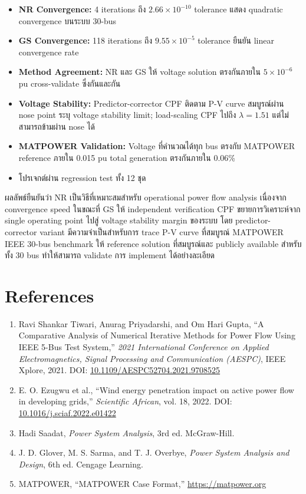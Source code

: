 \documentclass[12pt,a4paper]{article}
\begin{document}
\begin{itemize}
    \item \textbf{NR Convergence:} 4 iterations ถึง $2.66\times10^{-10}$ tolerance แสดง quadratic convergence บนระบบ 30-bus
    \item \textbf{GS Convergence:} 118 iterations ถึง $9.55\times10^{-5}$ tolerance ยืนยัน linear convergence rate
    \item \textbf{Method Agreement:} NR และ GS ให้ voltage solution ตรงกันภายใน $5\times10^{-6}$ pu cross-validate ซึ่งกันและกัน
    \item \textbf{Voltage Stability:} Predictor-corrector CPF ติดตาม P-V curve สมบูรณ์ผ่าน nose point ระบุ voltage stability limit; load-scaling CPF ไปถึง $\lambda = 1.51$ แต่ไม่สามารถข้ามผ่าน nose ได้
    \item \textbf{MATPOWER Validation:} Voltage ที่คำนวณได้ทุก bus ตรงกับ MATPOWER reference ภายใน 0.015 pu total generation ตรงกันภายใน 0.06\%
    \item โปรเจกต์ผ่าน regression test ทั้ง 12 ชุด
\end{itemize}

ผลลัพธ์ยืนยันว่า NR เป็นวิธีที่เหมาะสมสำหรับ operational power flow analysis เนื่องจาก convergence speed ในขณะที่ GS ให้ independent verification CPF ขยายการวิเคราะห์จาก single operating point ไปสู่ voltage stability margin ของระบบ โดย predictor-corrector variant มีความจำเป็นสำหรับการ trace P-V curve ที่สมบูรณ์ MATPOWER IEEE 30-bus benchmark ให้ reference solution ที่สมบูรณ์และ publicly available สำหรับทั้ง 30 bus ทำให้สามารถ validate การ implement ได้อย่างละเอียด

\section{References}

\begin{enumerate}
    \item Ravi Shankar Tiwari, Anurag Priyadarshi, and Om Hari Gupta, ``A Comparative Analysis of Numerical Iterative Methods for Power Flow Using IEEE 5-Bus Test System,'' \textit{2021 International Conference on Applied Electromagnetics, Signal Processing and Communication (AESPC)}, IEEE Xplore, 2021. DOI: \href{https://doi.org/10.1109/AESPC52704.2021.9708525}{10.1109/AESPC52704.2021.9708525}

    \item E. O. Ezugwu et al., ``Wind energy penetration impact on active power flow in developing grids,'' \textit{Scientific African}, vol. 18, 2022. DOI: \href{https://doi.org/10.1016/j.sciaf.2022.e01422}{10.1016/j.sciaf.2022.e01422}

    \item Hadi Saadat, \textit{Power System Analysis}, 3rd ed. McGraw-Hill.

    \item J. D. Glover, M. S. Sarma, and T. J. Overbye, \textit{Power System Analysis and Design}, 6th ed. Cengage Learning.

    \item MATPOWER, ``MATPOWER Case Format,'' \href{https://matpower.org}{https://matpower.org}
\end{enumerate}
\end{document}

